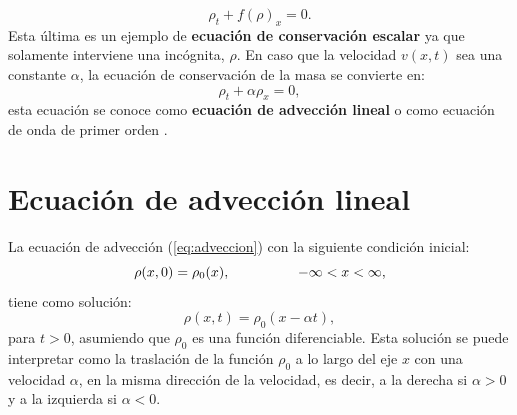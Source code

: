 \begin{equation}
	\rho_t + f(\rho)_x = 0.
\end{equation}
Esta última es un ejemplo de \textbf{ecuación de conservación escalar} ya que solamente interviene una incógnita, $\rho$.
En caso que la velocidad $v(x,t)$ sea una constante $\alpha$, la ecuación de conservación de la masa se convierte en:
\begin{equation}
	\rho_t + \alpha\rho_x = 0,
	\label{eq:adveccion}
\end{equation}
esta ecuación se conoce como \textbf{ecuación de advección lineal} o como ecuación de onda de primer orden \cite{heattransfer}.
\section{Ecuación de advección lineal}
La ecuación de advección (\ref{eq:adveccion}) con la siguiente condición inicial:
\begin{equation}
	\rho(x,0) = \rho_0(x), \hspace{1.7cm} -\infty < x < \infty,
\end{equation}
tiene como solución:
\begin{equation}
	\rho(x,t) = \rho_0(x - \alpha t),
	\label{eq:sol-advec}
\end{equation}
para $t> 0$, asumiendo que $\rho_0$ es una función diferenciable. Esta solución se puede interpretar como la traslación de la función $\rho_0$ a lo largo del eje $x$ con una velocidad $\alpha$, en la misma dirección de la velocidad, es decir, a la derecha si $\alpha > 0$ y a la izquierda si $\alpha < 0$.
